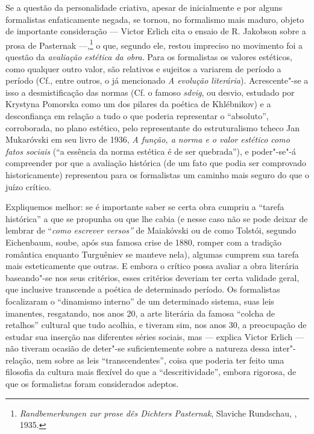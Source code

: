 {Se a questão da personalidade criativa, apesar de inicialmente e por
alguns formalistas enfaticamente negada, se tornou, no formalismo mais
maduro, objeto de importante consideração --- Victor Erlich cita o ensaio
de R. Jakobson sobre a prosa de Pasternak ---,\footnote{\emph{Randbemerkungen
  zur prose dês Dichters Pasternak}, Slaviche Rundschau, , 1935.} o
que, segundo ele, restou impreciso no movimento foi a questão da
\emph{avaliação estética da obra}. Para os formalistas os valores
estéticos, como qualquer outro valor, são relativos e sujeitos a
variarem de período a período (Cf., entre outros, o já mencionado
\emph{A evolução literária}). Acrescente"-se a isso a desmistificação das
normas (Cf. o famoso \emph{sdvig}, ou desvio, estudado por Krystyna
Pomorska como um dos pilares da poética de Khlébnikov) e a desconfiança
em relação a tudo o que poderia representar o ``absoluto'', corroborada,
no plano estético, pelo representante do estruturalismo tcheco Jan
Mukaróvski em seu livro de 1936, \emph{A função, a norma e o valor
estético como fatos sociais} (``a essência da norma estética é de ser
quebrada''), e poder"-se"-á compreender por que a avaliação histórica (de
um fato que podia ser comprovado historicamente) representou para os
formalistas um caminho mais seguro do que o juízo crítico.

Expliquemos melhor: se é importante saber se certa obra cumpriu a
``tarefa histórica'' a que se propunha ou que lhe cabia (e nesse caso
não se pode deixar de lembrar de ``\emph{como escrever versos''} de
Maiakóvski ou de como Tolstói, segundo Eichenbaum, soube, após sua
famosa crise de 1880, romper com a tradição romântica enquanto
Turguêniev se manteve nela), algumas cumprem sua tarefa mais
esteticamente que outras. E embora o crítico possa avaliar a obra
literária baseando"-se nos seus critérios, esses critérios deveriam ter
certa validade geral, que inclusive transcende a poética de determinado
período. Os formalistas focalizaram o ``dinamismo interno'' de um
determinado sistema, suas leis imanentes, resgatando, nos anos 20, a
arte literária da famosa ``colcha de retalhos'' cultural que tudo
acolhia, e tiveram sim, nos anos 30, a preocupação de estudar sua
inserção nas diferentes séries sociais, mas --- explica Victor Erlich ---
não tiveram ocasião de deter"-se suficientemente sobre a natureza dessa
inter"-relação, nem sobre as leis ``transcendentes'', coisa que poderia
ter feito uma filosofia da cultura mais flexível do que a
``descritividade'', embora rigorosa, de que os formalistas foram considerados
adeptos.

}
